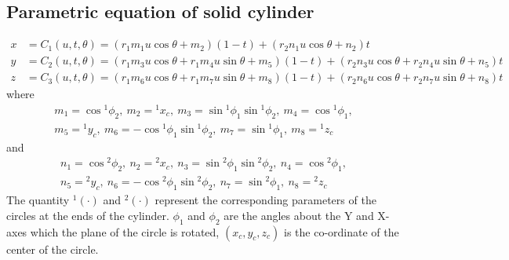 \documentclass[12pt,a4]{article}
\begin{document}
\subsection{Parametric equation of solid cylinder}\label{app:parametric_u_v_solid_cyl}
\begin{align}
x & = C_1(u,t,\theta)=\left(r_1m_1u\cos\theta +m_2 \right)\left(1-t \right)+\left(r_2n_1u\cos\theta+n_2 \right)t\\
y & = C_2(u,t,\theta)=\left(r_1m_3u\cos\theta +r_1m_4u\sin\theta +m_5 \right)\left(1-t \right)+\left(r_2n_3u\cos\theta+r_2n_4u\sin\theta+n_5 \right)t\\
z & = C_3(u,t,\theta)=\left(r_1m_6u\cos\theta +r_1m_7u\sin\theta +m_8 \right)\left(1-t \right)+\left(r_2n_6u\cos\theta+r_2n_7u\sin\theta+n_8 \right)t
\end{align}
where
\begin{align*}
m_1 = \cos{}^1\phi_2,~m_2 = {}^1x_c,~m_3 = \sin{}^1\phi_1\sin{}^1\phi_2,~m_4=\cos{}^1\phi_1, \nonumber \\
m_5 = {}^1y_c,~m_6=-\cos{}^1\phi_1\sin{}^1\phi_2,~m_7=\sin{}^1\phi_1,~m_8={}^1z_c \nonumber
\end{align*}
and
\begin{align*}
n_1 = \cos{}^2\phi_2,~n_2 = {}^2x_c,~n_3 = \sin{}^2\phi_1\sin{}^2\phi_2,~n_4=\cos{}^2\phi_1, \nonumber \\
n_5 = {}^2y_c,~n_6=-\cos{}^2\phi_1\sin{}^2\phi_2,~n_7=\sin{}^2\phi_1,~n_8={}^2z_c \nonumber
\end{align*}
The quantity ${}^1\left(\cdot\right)$ and ${}^2\left(\cdot\right)$ represent the corresponding parameters of the circles at the ends of the cylinder. $\phi_1$ and $\phi_2$ are the angles about the Y and X-axes which the plane of the circle is rotated, $(x_c,y_c,z_c)$ is the co-ordinate of the center of the circle.
%

\begin{thebibliography}{99}

%
%


\end{thebibliography}
\end{document}
